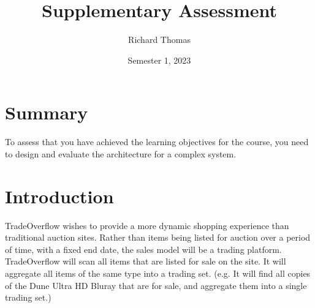 \documentclass{csse4400}
\title{Supplementary Assessment}
\author{Richard Thomas}
\date{Semester 1, 2023}
\begin{document}
\maketitle

\section*{Summary}
To assess that you have achieved the learning objectives for the course,
you need to design and evaluate the architecture for a complex system.


\section{Introduction}
TradeOverflow wishes to provide a more dynamic shopping experience than traditional auction sites.
Rather than items being listed for auction over a period of time, with a fixed end date,
the sales model will be a trading platform.
TradeOverflow will scan all items that are listed for sale on the site.
It will aggregate all items of the same type into a trading set.
(e.g. It will find all copies of the Dune Ultra HD Bluray that are for sale, and aggregate them into a single trading set.)
\end{document}
